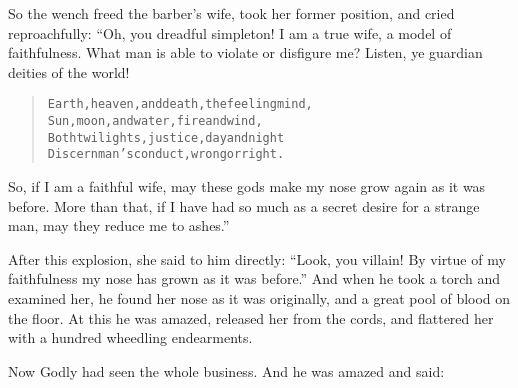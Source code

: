 \documentclass[article, twoside, 14pt]{memoir}
\renewenvironment{verbatim}{%
\begin{quote}%
\vskip -10pt%
\begin{alltt}\normalfont\large}{\end{alltt}%
\end{quote}%
\vskip -10pt
} %
\begin{document}
So the wench freed the barber's wife, took her former
position, and cried reproachfully: “Oh, you dreadful simpleton! I
am a true wife, a model of faithfulness. What man is able to
violate or disfigure me? Listen, ye guardian deities of the world!

\begin{verbatim}
Earth, heaven, and death, the feeling mind,
Sun, moon, and water, fire and wind,
Both twilights, justice, day and night
Discern man's conduct, wrong or right.
\end{verbatim}
So, if I am a faithful wife, may these gods make my nose grow again
as it was before. More than that, if I have had so much as a secret
desire for a strange man, may they reduce me to ashes.”

After this explosion, she said to him directly:
``Look, you villain! By virtue of my faithfulness my nose has grown as it was before.''
And when he took a torch and examined her, he found her nose as it
was originally, and a great pool of blood on the floor. At this he
was amazed, released her from the cords, and flattered her with a
hundred wheedling endearments.

Now Godly had seen the whole business. And he was amazed and said:
\end{document}
